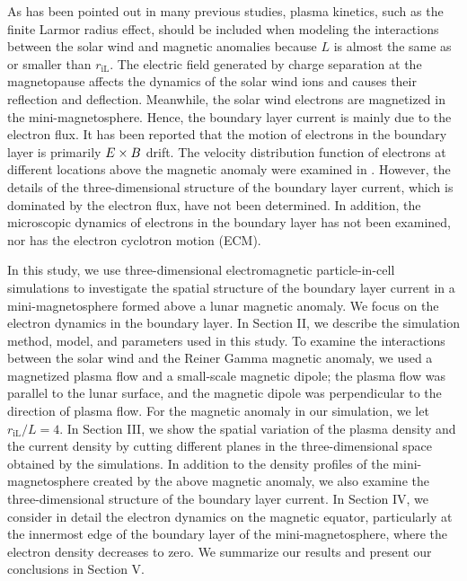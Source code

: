 \documentclass[draft,jgrga]{agutex2015}
\begin{document}
\begin{article}
As has been pointed out in many previous studies,
plasma kinetics, such as the finite Larmor radius effect, should be included when modeling
the interactions between the solar wind and magnetic anomalies
because $L$ is almost the same as or smaller than $r_\mathrm{iL}$.
The electric field generated by
charge separation at the magnetopause affects 
the dynamics of the solar wind ions and 
causes their reflection and deflection. %
Meanwhile, the solar wind electrons are magnetized in the mini-magnetosphere.
Hence, the boundary layer current is mainly due to the electron flux.
It has been reported that the motion of electrons in the boundary layer 
is primarily 
$\mbox{\boldmath $E$} \times \mbox{\boldmath $B$}$ drift.
The velocity distribution function of electrons at different locations above
the magnetic anomaly were examined in \cite{Deca2015}.
However, the details of the three-dimensional structure of the boundary layer current,
which is dominated by the electron flux, have not been determined.
In addition, 
the microscopic dynamics of electrons in the boundary layer has not been
examined, nor has the electron cyclotron motion (ECM).
%

In this study,
we use three-dimensional electromagnetic particle-in-cell simulations to investigate the spatial structure of the boundary layer current 
in a mini-magnetosphere formed above a lunar magnetic anomaly.
We focus on the electron dynamics in the boundary layer.
In Section II, we describe the simulation method, model, and parameters used in this study.
To examine the interactions between the solar wind and the Reiner Gamma magnetic anomaly, we used a magnetized plasma flow and a small-scale magnetic dipole; 
the plasma flow was parallel to the lunar surface, and the magnetic dipole was perpendicular to
the direction of plasma flow.
For the magnetic anomaly in our simulation, we let $r_\mathrm{iL} /L=4$.
In Section III, we show the spatial variation of the plasma density and the current density
by cutting different planes in the three-dimensional space obtained by the simulations.
In addition to the density profiles of the mini-magnetosphere created by the above magnetic anomaly, 
we also examine the three-dimensional structure of the boundary layer current.
In Section IV, we consider in detail the electron dynamics on the magnetic equator,
particularly at the innermost edge of the boundary layer of the mini-magnetosphere, 
where the electron density decreases to zero.
We summarize our results and present our conclusions in Section V.



\end{article}
\end{document}

